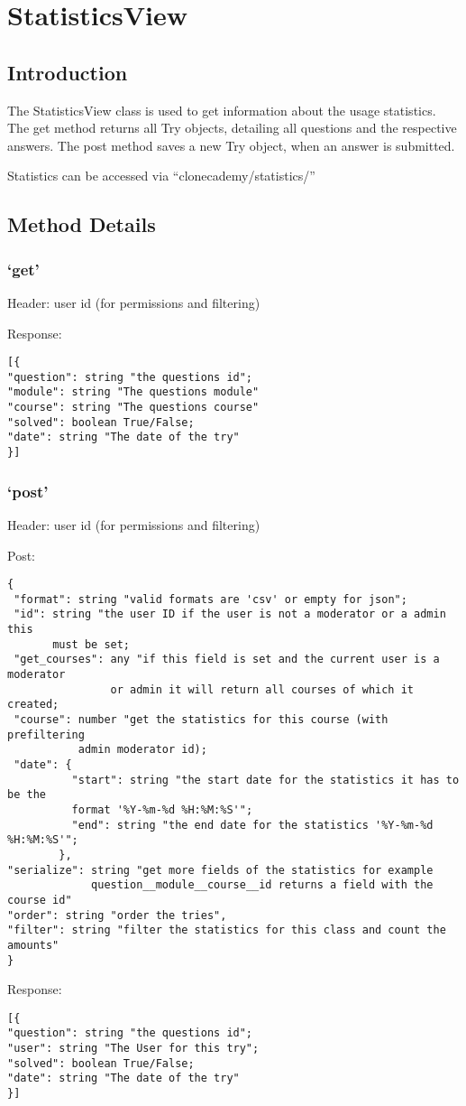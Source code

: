 \chapter*{StatisticsView}

\section*{Introduction}\label{introduction}

The StatisticsView class is used to get information about the usage
statistics. The get method returns all Try objects, detailing all
questions and the respective answers. The post method saves a new Try
object, when an answer is submitted.

Statistics can be accessed via ``clonecademy/statistics/''

\section*{Method Details}\label{method-details}

\subsection*{\texorpdfstring{`get'}{get}}\label{get}

Header: user id (for permissions and filtering)

Response:

\begin{verbatim}
[{
"question": string "the questions id";
"module": string "The questions module"
"course": string "The questions course"
"solved": boolean True/False;
"date": string "The date of the try"
}]
\end{verbatim}

\subsection*{\texorpdfstring{`post'}{post}}\label{post}

Header: user id (for permissions and filtering)

Post:

\begin{verbatim}
{ 
 "format": string "valid formats are 'csv' or empty for json";
 "id": string "the user ID if the user is not a moderator or a admin this 
 	   must be set;
 "get_courses": any "if this field is set and the current user is a moderator 
  				or admin it will return all courses of which it created;
 "course": number "get the statistics for this course (with prefiltering 
 		   admin moderator id);
 "date": {
          "start": string "the start date for the statistics it has to be the 
          format '%Y-%m-%d %H:%M:%S'";
          "end": string "the end date for the statistics '%Y-%m-%d %H:%M:%S'";
        },
"serialize": string "get more fields of the statistics for example
             question__module__course__id returns a field with the course id"
"order": string "order the tries",
"filter": string "filter the statistics for this class and count the amounts"
}
\end{verbatim}

Response:

\begin{verbatim}
[{
"question": string "the questions id";
"user": string "The User for this try";
"solved": boolean True/False;
"date": string "The date of the try"
}]
\end{verbatim}


